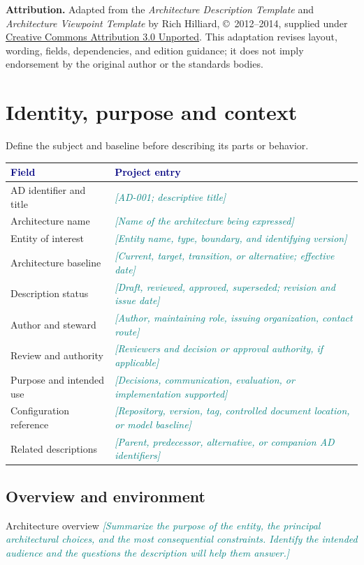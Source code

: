 \documentclass[11pt,letterpaper]{article}
\newcommand{\TemplatePageBreak}{\clearpage}
\newcommand{\FillIn}[1]{\textcolor{Teal}{\sffamily\itshape[#1]}}
\newcommand{\TableHead}[1]{\textcolor{Navy}{\sffamily\bfseries#1}}
\newcommand{\Lead}[1]{\textcolor{Muted}{#1}\par\vspace{3pt}}
\newcommand{\TemplateAttribution}{%
  \textbf{Attribution.} Adapted from the \emph{Architecture Description Template}
  and \emph{Architecture Viewpoint Template} by Rich Hilliard,
  \copyright\ 2012--2014, supplied under
  \href{https://creativecommons.org/licenses/by/3.0/}{Creative Commons Attribution 3.0 Unported}.
  This adaptation revises layout, wording, fields, dependencies, and edition guidance;
  it does not imply endorsement by the original author or the standards bodies.}
\begin{document}
\vfill
{\footnotesize\color{Muted}\TemplateAttribution\par}

\TemplatePageBreak
\section{Identity, purpose and context}
\Lead{Define the subject and baseline before describing its parts or behavior.}

{\small
\begin{tabularx}{\linewidth}{@{}L{1.52in}Y@{}}
\toprule
\TableHead{Field} & \TableHead{Project entry}\\
\midrule
AD identifier and title & \FillIn{AD-001; descriptive title}\\
Architecture name & \FillIn{Name of the architecture being expressed}\\
Entity of interest & \FillIn{Entity name, type, boundary, and identifying version}\\
Architecture baseline & \FillIn{Current, target, transition, or alternative; effective date}\\
Description status & \FillIn{Draft, reviewed, approved, superseded; revision and issue date}\\
Author and steward & \FillIn{Author, maintaining role, issuing organization, contact route}\\
Review and authority & \FillIn{Reviewers and decision or approval authority, if applicable}\\
Purpose and intended use & \FillIn{Decisions, communication, evaluation, or implementation supported}\\
Configuration reference & \FillIn{Repository, version, tag, controlled document location, or model baseline}\\
Related descriptions & \FillIn{Parent, predecessor, alternative, or companion AD identifiers}\\
\bottomrule
\end{tabularx}}

\subsection{Overview and environment}
\begin{TemplateRecord}{Architecture overview}
\FillIn{Summarize the purpose of the entity, the principal architectural choices,
and the most consequential constraints. Identify the intended audience and
the questions the description will help them answer.}
\end{TemplateRecord}
\end{document}

